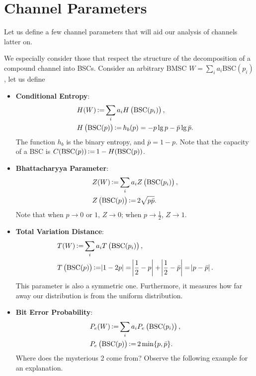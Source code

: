\section{Channel Parameters}

Let us define a few channel parameters that will aid our analysis of channels latter on.

We especially consider those that respect the structure of the decomposition of a compound channel into BSCs. Consider an arbitrary BMSC $W=\sum_{i}a_i\mathrm{BSC}(p_i)$, let us define
\begin{definition}
    \begin{itemize}
        \item \textbf{Conditional Entropy}:
        \begin{align}
            &H(W) \operatorname{\vcentcolon=} \sum_{i}a_i H\left(\mathrm{BSC}(p_i)\right),\\
            &H\left(\mathrm{BSC}(p)\right) \operatorname{\vcentcolon=} h_b(p) = -p\lg p - \bar{p}\lg\bar{p}.
        \end{align}
        The function $h_b$ is the binary entropy, and $\bar{p}=1-p$. Note that the capacity of a BSC is $C(\mathrm{BSC}(p)) \operatorname{\vcentcolon=} 1-H(\mathrm{BSC}(p))$.
        \item \textbf{Bhattacharyya Parameter}:
        \begin{align}
            &Z(W) \operatorname{\vcentcolon=} \sum_{i}a_i Z\left(\mathrm{BSC}(p_i)\right),\\
            &Z\left(\mathrm{BSC}(p)\right) \operatorname{\vcentcolon=} 2\sqrt{p\bar{p}}.
        \end{align}
        Note that when $p\rightarrow0$ or $1$, $Z\rightarrow0$; when $p\rightarrow\frac{1}{2}$, $Z\rightarrow1$.
        \item \textbf{Total Variation Distance}:
        \begin{align}
            &T(W) \operatorname{\vcentcolon=} \sum_{i}a_i T\left(\mathrm{BSC}(p_i)\right),\\
            &T\left(\mathrm{BSC}(p)\right) \operatorname{\vcentcolon=} \abs{1-2p} = \abs{\frac{1}{2}-p} + \abs{\frac{1}{2}-\bar{p}} = \abs{p-\bar{p}}.
        \end{align}
        This parameter is also a symmetric one. Furthermore, it measures how far away our distribution is from the uniform distribution.
        \item \textbf{Bit Error Probability}:
        \begin{align}
            &P_e(W) \operatorname{\vcentcolon=} \sum_{i}a_i P_e\left(\mathrm{BSC}(p_i)\right),\\
            &P_e\left(\mathrm{BSC}(p)\right) \operatorname{\vcentcolon=} 2\min\{p,\bar{p}\}.
        \end{align}
        Where does the mysterious 2 come from? Observe the following example for an explanation.
    \end{itemize}
\end{definition}

